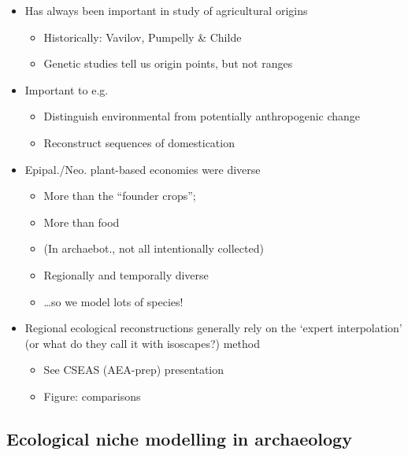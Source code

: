 \documentclass[
  authoryear,
  review]{elsarticle}
\providecommand{\tightlist}{%
  \setlength{\itemsep}{0pt}\setlength{\parskip}{0pt}}\usepackage{longtable,booktabs,array}
\begin{document}
\begin{itemize}
\tightlist
\item
  Has always been important in study of agricultural origins

  \begin{itemize}
  \tightlist
  \item
    Historically: Vavilov, Pumpelly \& Childe
  \item
    Genetic studies tell us origin points, but not ranges
  \end{itemize}
\item
  Important to e.g.

  \begin{itemize}
  \tightlist
  \item
    Distinguish environmental from potentially anthropogenic change
    \citep{MartinEtAl2017, MartinEtAl2025}
  \item
    Reconstruct sequences of domestication \citep{YeomansEtAl2017}
  \end{itemize}
\item
  Epipal./Neo. plant-based economies were diverse

  \begin{itemize}
  \tightlist
  \item
    More than the ``founder crops'';
  \item
    More than food
  \item
    (In archaebot., not all intentionally collected)
  \item
    Regionally and temporally diverse
  \item
    \ldots so we model lots of species!
  \end{itemize}
\item
  Regional ecological reconstructions generally rely on the `expert
  interpolation' (or what do they call it with isoscapes?) method

  \begin{itemize}
  \tightlist
  \item
    See CSEAS (AEA-prep) presentation
  \item
    Figure: comparisons
  \end{itemize}
\end{itemize}

\subsection{Ecological niche modelling in
archaeology}\label{ecological-niche-modelling-in-archaeology}
\end{document}
